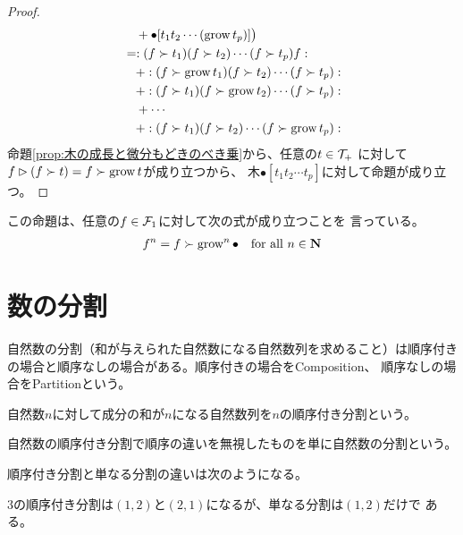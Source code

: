 \begin{proof}
\begin{equation*}
\begin{split}
			&\quad + \bullet[t_1t_2\cdots (\operatorname{grow}t_p)]\bigr) \\
			&= :(f\succ t_1)(f\succ t_2)\cdots(f\succ t_p)f: \\
			&\quad + :(f\succ\operatorname{grow}t_1)(f\succ t_2)\cdots(f\succ t_p): \\
			&\quad + :(f\succ t_1)(f\succ\operatorname{grow}t_2)\cdots(f\succ t_p): \\
			&\quad + \cdots \\
			&\quad + :(f\succ t_1)(f\succ t_2)\cdots(f\succ\operatorname{grow}t_p): \\
		\end{split}\end{equation*} %
		命題\ref{prop:木の成長と微分もどきのべき乗}から、任意の$t\in{\mathcal{T}}_+$
		に対して$f\rhd(f\succ t)=f\succ\operatorname{grow}t$が成り立つから、
		木$\bullet[t_1t_2\cdots t_p]$に対して命題が成り立つ。
	\end{proof} %

	この命題は、任意の$f\in{\mathcal{F}}_1$に対して次の式が成り立つことを
	言っている。
	\begin{equation*}\begin{split} %
		f^n = f\succ\myop{grow}^n\bullet \quad\text{for all }n\in \mybf{N}
	\end{split}\end{equation*} %

\section{数の分割}\label{s1:数の分割} %
	自然数の分割（和が与えられた自然数になる自然数列を求めること）は順序付き
	の場合と順序なしの場合がある。順序付きの場合をComposition、
	順序なしの場合をPartitionという。

	\begin{definition}\label{def:自然数の順序つき分割} %
		自然数$n$に対して成分の和が$n$になる自然数列を$n$の順序付き分割という。
	\end{definition} %

	\begin{definition}\label{def:自然数の分割} %
		自然数の順序付き分割で順序の違いを無視したものを単に自然数の分割という。
	\end{definition} %

	順序付き分割と単なる分割の違いは次のようになる。

	\begin{example}[自然数の順序付き分割と単なる分割の違い]\label{eg:自然数の順序付き分割と単なる分割の違い} %
		$3$の順序付き分割は$(1,2)$と$(2,1)$になるが、単なる分割は$(1,2)$だけで
		ある。
	\end{example} %

